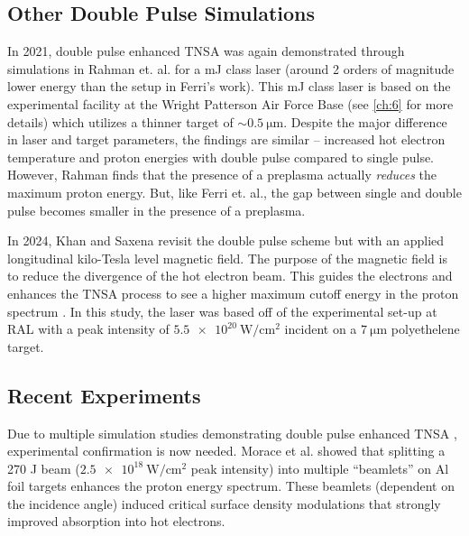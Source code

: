 \subsection{Other Double Pulse Simulations}
In 2021, double pulse enhanced \gls{TNSA} was again demonstrated through simulations in Rahman et. al. \cite{Rahman_2021_PoP} for a mJ class laser (around 2 orders of magnitude lower energy than the setup in Ferri's work). This mJ class laser is based on the experimental facility at the Wright Patterson Air Force Base (see \autoref{ch:6} for more details) which utilizes a thinner target of $\sim \SI{0.5}{\micro \meter}$. Despite the major difference in laser and target parameters, the findings are similar -- increased hot electron temperature and proton energies with double pulse compared to single pulse. However, Rahman finds that the presence of a preplasma actually \emph{reduces} the maximum proton energy. But, like Ferri et. al., the gap between single and double pulse becomes smaller in the presence of a preplasma.

In 2024, Khan and Saxena \cite{Khan_2024_NJoP} revisit the double pulse scheme but with an applied longitudinal kilo-Tesla level magnetic field. The purpose of the magnetic field is to reduce the divergence of the hot electron beam. This guides the electrons and enhances the \gls{TNSA} process to see a higher maximum cutoff energy in the proton spectrum \cite{Arefiev_2016_NJoP}. In this study, the laser was based off of the experimental set-up at \gls{RAL} with a peak intensity of $\SI{5.5e20}{\watt \per \centi \meter \squared}$ incident on a $\SI{7}{\micro \meter}$ polyethelene target. 


\subsection{Recent Experiments}

Due to multiple simulation studies demonstrating double pulse enhanced \gls{TNSA} \cite{Ferri_2019_Nat_Comm,Rahman_2021_PoP,Khan_2024_NJoP}, experimental confirmation is now needed. Morace et al. \cite{Morace_2019_Nat_Comm} showed that splitting a 270 J beam ($\SI{2.5e18}{\watt \per \centi \meter \squared}$ peak intensity) into multiple ``beamlets'' on Al foil targets enhances the proton energy spectrum. These beamlets (dependent on the incidence angle) induced critical surface density modulations that strongly improved absorption into hot electrons. 

